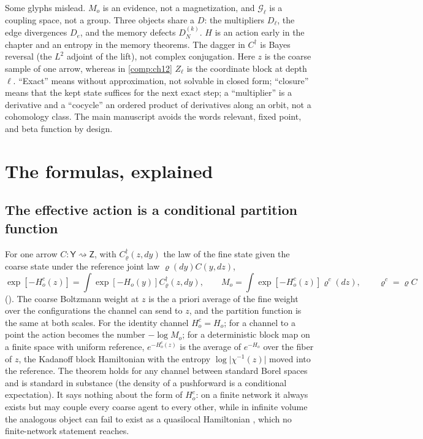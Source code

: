 Some glyphs mislead. $M_o$ is an evidence, not a magnetization, and $\mathcal G_\ell$ is a coupling
space, not a group. Three objects share a $D$: the multipliers $D_\ell$, the edge divergences $D_e$,
and the memory defects $D^{(k)}_N$. $H$ is an action early in the chapter and an entropy in the memory
theorems. The dagger in $C^\dagger$ is Bayes reversal (the $L^2$ adjoint of the lift), not complex
conjugation. Here $z$ is the coarse sample of one arrow, whereas in \cref{comp:ch12} $Z_\ell$ is the
coordinate block at depth $\ell$. ``Exact'' means without approximation, not solvable in closed form;
``closure'' means that the kept state suffices for the next exact step; a ``multiplier'' is a
derivative and a ``cocycle'' an ordered product of derivatives along an orbit, not a cohomology
class. The main manuscript avoids the words relevant, fixed point, and beta function by design.

\section{The formulas, explained}
\label{comp:ch11-formulas}

\subsection{The effective action is a conditional partition function}

For one arrow $C:\mathsf Y\rightsquigarrow\mathsf Z$, with $C^\dagger_\varrho(z,dy)$ the law of the
fine state given the coarse state under the reference joint law $\varrho(dy)C(y,dz)$,
\[
\exp[-H^c_o(z)]=\int\exp[-H_o(y)]C^\dagger_\varrho(z,dy),
\qquad
M_o=\int\exp[-H^c_o(z)]\varrho^c(dz),
\qquad\varrho^c=\varrho C
\]
(). The coarse Boltzmann weight at $z$ is the a priori average of the
fine weight over the configurations the channel can send to $z$, and the partition function is the
same at both scales. For the identity channel $H^c_o=H_o$; for a channel to a point the action
becomes the number $-\log M_o$; for a deterministic block map on a finite space with uniform
reference, $e^{-H^c_o(z)}$ is the average of $e^{-H_o}$ over the fiber of $z$, the Kadanoff block
Hamiltonian with the entropy $\log\lvert\chi^{-1}(z)\rvert$ moved into the reference. The theorem holds for any channel between standard Borel spaces
and is standard in substance (the density of a pushforward is a conditional expectation). It says
nothing about the form of $H^c_o$: on a finite network it always exists but may couple every coarse
agent to every other, while in infinite volume the analogous object can fail to exist as a
quasilocal Hamiltonian \citep{VanEnterFernandezSokal1993}, which no finite-network statement reaches.

